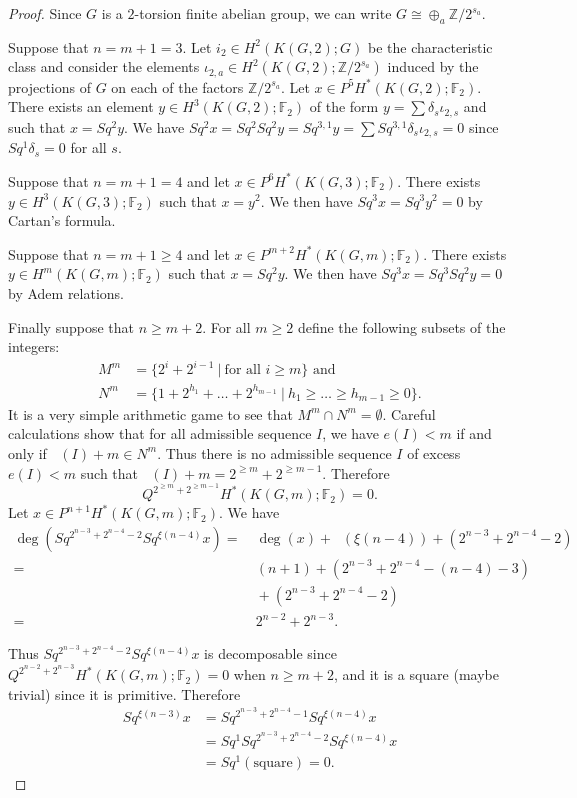 \documentclass{amsart}
\theoremstyle{definition}
\theoremstyle{remark}
\DeclareMathOperator{\degst}{deg_{st}}
\newcommand{\Z}{\mathbb{Z}}
\newcommand{\F}{\mathbb{F}}
\renewcommand{\geq}{\geqslant}
\begin{document}
\newpage
\begin{proof}
Since $G$ is a $2$-torsion finite abelian group, we can write $G\cong\oplus_a\Z/2^{s_a}$. 

Suppose that $n=m+1=3$. Let $i_2\in H^2(K(G,2);G)$ be the characteristic class and consider the elements $\iota_{2,a}\in H^2(K(G,2);\Z/2^{s_a})$ induced by the projections of $G$ on each of the factors $\Z/2^{s_a}$. Let $x\in P^5H^*(K(G,2);\F_2)$. There exists an element $y\in H^3(K(G,2);\F_2)$ of the form $y=\sum\delta_s\iota_{2,s}$ and such that $x=Sq^2y$. We have $Sq^2x=Sq^2Sq^2y=Sq^{3,1}y=\sum Sq^{3,1}\delta_s\iota_{2,s}=0$ since $Sq^1\delta_s=0$ for all $s$.

Suppose that $n=m+1=4$ and let $x\in P^6H^*(K(G,3);\F_2)$. There exists $y\in H^3(K(G,3);\F_2)$ such that $x=y^2$. We then have $Sq^3x=Sq^3y^2=0$ by Cartan's formula.

Suppose that $n=m+1\geq4$ and let $x\in P^{m+2}H^*(K(G,m);\F_2)$. There exists $y\in H^m(K(G,m);\F_2)$ such that $x=Sq^2y$. We then have $Sq^3 x=Sq^3Sq^2y=0$ by Adem relations.

Finally suppose that $n\geq m+2$. For all $m\geq2$ define the following subsets of the integers:
\begin{align*}
M^m &=\{2^i+2^{i-1}\ |\ \text{for all $i\geq m$}\} \text{ and}\\
N^m &=\{1+2^{h_1}+\dots+2^{h_{m-1}}\ |\ h_1\geq\dots\geq h_{m-1}\geq0\}.
\end{align*}
It is a very simple arithmetic game to see that $M^m\cap N^m=\emptyset$. Careful calculations show that for all admissible sequence $I$, we have $e(I)<m$ if and only if $\degst(I)+m\in N^m$. Thus there is no admissible sequence $I$ of excess $e(I)<m$ such that $\degst(I)+m=2^{\geq m}+2^{\geq m-1}$. Therefore
$$
Q^{2^{\geq m}+2^{\geq m-1}}H^*(K(G,m);\F_2)=0.
$$
Let $x\in P^{n+1}H^*(K(G,m);\F_2)$. We have
\begin{align*}
\deg(Sq^{2^{n-3}+2^{n-4}-2}Sq^{\xi(n-4)}x) = &\ \deg(x) + \degst(\xi(n-4)) + (2^{n-3}+2^{n-4}-2)\\
= &\ (n+1) + (2^{n-3}+2^{n-4}-(n-4)-3)\\ 
&\ +(2^{n-3}+2^{n-4}-2)\\
= &\ 2^{n-2}+2^{n-3}.
\end{align*}

Thus $Sq^{2^{n-3}+2^{n-4}-2}Sq^{\xi(n-4)}x$ is decomposable since $Q^{2^{n-2}+2^{n-3}}H^*(K(G,m);\F_2)=0$ when $n\geq m+2$, and it is a square (maybe trivial) since it is primitive. Therefore 
\begin{align*}
Sq^{\xi(n-3)}x &= Sq^{2^{n-3}+2^{n-4}-1}Sq^{\xi(n-4)}x\\
&=Sq^1Sq^{2^{n-3}+2^{n-4}-2}Sq^{\xi(n-4)}x\\
&=Sq^1(\text{square}) =0.
\end{align*}

\end{proof}
\end{document}
